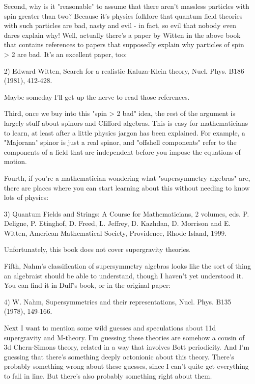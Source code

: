 Second, why is it "reasonable" to assume that there aren't massless 
particles with spin greater than two?  Because it's physics folklore 
that quantum field theories with such particles are bad, nasty and evil 
- in fact, so evil that nobody even dares explain why!  Well, actually 
there's a paper by Witten in the above book that contains references to 
papers that supposedly explain why particles of spin > 2 are bad.  It's  
an excellent paper, too: 
 
2) Edward Witten, Search for a realistic Kaluza-Klein theory, Nucl. 
Phys. B186 (1981), 412-428. 
 
Maybe someday I'll get up the nerve to read those references. 
 
Third, once we buy into this "spin > 2 bad" idea, the rest
of the argument is largely stuff about spinors and Clifford algebras.
This is easy for mathematicians to learn, at least after a little
physics jargon has been explained.  For example, a "Majorana"
spinor is just a real spinor, and "offshell components" refer
to the components of a field that are independent before you impose the
equations of motion.
 
Fourth, if you're a mathematician wondering what "supersymmetry  
algebras" are, there are places where you can start learning about 
this without needing to know lots of physics: 
 
3) Quantum Fields and Strings: A Course for Mathematicians, 2 volumes,
eds. P. Deligne, P. Etinghof, D. Freed, L. Jeffrey, D. Kazhdan, D. Morrison 
and E. Witten, American Mathematical Society, Providence, Rhode Island,
1999.
 
Unfortunately, this book does not cover supergravity theories. 
 
Fifth, Nahm's classification of supersymmetry algebras looks like the 
sort of thing an algebraist should be able to understand, though I 
haven't yet understood it.  You can find it in Duff's book, or in the 
original paper:  
 
4) W. Nahm, Supersymmetries and their representations, Nucl. Phys. 
B135 (1978), 149-166. 
 
Next I want to mention some wild guesses and speculations about 11d  
supergravity and M-theory.  I'm guessing these theories are somehow 
a cousin of 3d Chern-Simons theory, related in a way that involves 
Bott periodicity.  And I'm guessing that there's something deeply 
octonionic about this theory.  There's probably something wrong about
these guesses, since I can't quite get everything to fall in line.
But there's also probably something right about them.
 
